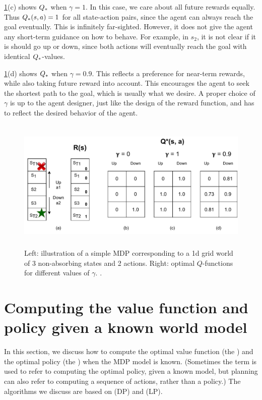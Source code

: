 \cref{fig:Q1d}(c) shows $Q_{*}$ when $\gamma=1$.
In this case, we care about all future rewards equally.
Thus $Q_{*}(s,a)=1$ for all state-action pairs,
since the agent can always reach the goal eventually. 
This is infinitely far-sighted.
However, it does not give the agent
any short-term guidance on how to behave.
For example, in $s_2$, it is not clear if it is should go up or down,
since both actions will eventually reach the goal
with identical $Q_{*}$-values.

\cref{fig:Q1d}(d) shows $Q_{*}$ when $\gamma=0.9$.
This reflects a preference for near-term rewards,
while also taking future reward into account.
This encourages the agent to seek the shortest path
to the goal, which is usually what we desire.
A proper choice of $\gamma$ is up to the agent designer, just like the design of the reward function,
and has to reflect the desired behavior of the agent.

\begin{figure}
\centering
\includegraphics[height=2.5in]{figs/DRL-1d-Q_new}
\caption{
  Left: illustration of a simple MDP
  corresponding to a 1d grid world
  of 3 non-absorbing states and 2 actions.
  Right: optimal $Q$-functions for different values of $\gamma$.
.
}
\label{fig:Q1d}
\end{figure}

\section{Computing the value function and policy given a known world model}
\label{sec:planning}
\label{sec:rl-planning}
\label{sec:DPRL}

In this section, we discuss how
to compute the optimal value function (the )
and the optimal policy (the )
when the MDP model is known.
(Sometimes the term  is used to refer
to computing the optimal policy, given a known model,
but planning can also refer to computing a sequence of actions,
rather than a policy.)
The algorithms we discuss are based on
 (DP)
and  (LP).

